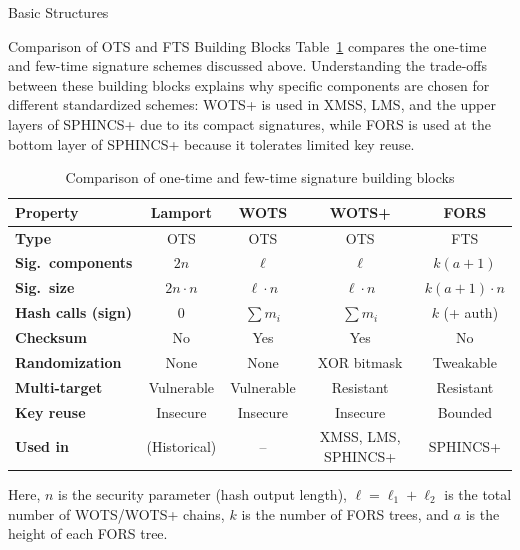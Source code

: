 \documentclass[version=preprint]{iacrcc}
\begin{document}
\begin{section}{Basic Structures}{\label{sec1}}
\begin{subsection}{Comparison of OTS and FTS Building Blocks}
Table~\ref{tab:ots_comparison} compares the one-time and few-time signature schemes discussed above. Understanding the trade-offs between these building blocks explains why specific components are chosen for different standardized schemes: WOTS+ is used in XMSS, LMS, and the upper layers of SPHINCS+ due to its compact signatures, while FORS is used at the bottom layer of SPHINCS+ because it tolerates limited key reuse.

\begin{table}[ht]
\centering
\renewcommand{\arraystretch}{1.3}
\caption{Comparison of one-time and few-time signature building blocks}
\label{tab:ots_comparison}
\begin{tabular}{|l|c|c|c|c|}
\hline
\textbf{Property} & \textbf{Lamport} & \textbf{WOTS} & \textbf{WOTS+} & \textbf{FORS} \\
\hline
\textbf{Type} & OTS & OTS & OTS & FTS \\
\hline
\textbf{Sig.\ components} & $2n$ & $\ell$ & $\ell$ & $k(a+1)$ \\
\hline
\textbf{Sig.\ size} & $2n \cdot n$ & $\ell \cdot n$ & $\ell \cdot n$ & $k(a+1) \cdot n$ \\
\hline
\textbf{Hash calls (sign)} & $0$ & $\sum m_i$ & $\sum m_i$ & $k$ (+ auth) \\
\hline
\textbf{Checksum} & No & Yes & Yes & No \\
\hline
\textbf{Randomization} & None & None & XOR bitmask & Tweakable \\
\hline
\textbf{Multi-target} & Vulnerable & Vulnerable & Resistant & Resistant \\
\hline
\textbf{Key reuse} & Insecure & Insecure & Insecure & Bounded \\
\hline
\textbf{Used in} & (Historical) & -- & XMSS, LMS, SPHINCS+ & SPHINCS+ \\
\hline
\end{tabular}
\end{table}

Here, $n$ is the security parameter (hash output length), $\ell = \ell_1 + \ell_2$ is the total number of WOTS/WOTS+ chains, $k$ is the number of FORS trees, and $a$ is the height of each FORS tree.

\end{subsection}


\end{section}
\end{document}
